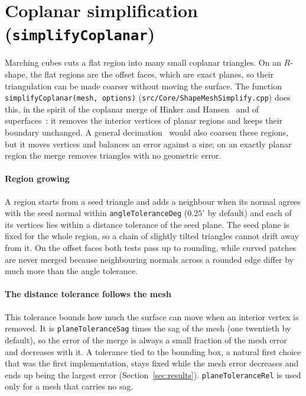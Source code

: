 \documentclass[11pt,a4paper]{article}
\newcommand{\code}[1]{\texttt{#1}}
\begin{document}
\section{Coplanar simplification (\texttt{simplifyCoplanar})}
\label{sec:simplify}

Marching cubes cuts a flat region into many small coplanar triangles. On an
$R$-shape, the flat regions are the offset faces, which are exact planes, so their
triangulation can be made coarser without moving the surface. The function
\code{simplifyCoplanar(mesh, options)} (\code{src/Core/ShapeMeshSimplify.cpp})
does this, in the spirit of the coplanar merge of Hinker and
Hansen~\cite{hinker1993} and of superfaces~\cite{kalvin1996}: it removes the
interior vertices of planar regions and keeps their boundary unchanged. A general
decimation~\cite{schroeder1992,garland1997} would also coarsen these regions, but it
moves vertices and balances an error against a size; on an exactly planar region
the merge removes triangles with no geometric error.

\paragraph{Region growing} A region starts from a seed triangle and adds a
neighbour when its normal agrees with the seed normal within
\code{angleToleranceDeg} ($0.25^\circ$ by default) and each of its vertices lies
within a distance tolerance of the seed plane. The seed plane is fixed for the
whole region, so a chain of slightly tilted triangles cannot drift away from it.
On the offset faces both tests pass up to rounding, while curved patches are never
merged because neighbouring normals across a rounded edge differ by much more than
the angle tolerance.

\paragraph{The distance tolerance follows the mesh} This tolerance bounds how much
the surface can move when an interior vertex is removed. It is
\code{planeToleranceSag} times the sag of the mesh (one twentieth by default), so
the error of the merge is always a small fraction of the mesh error and decreases
with it. A tolerance tied to the bounding box, a natural first choice that was the
first implementation, stays fixed while the mesh error decreases and ends up being
the largest error (Section~\ref{sec:results}). \code{planeToleranceRel} is used only
for a mesh that carries no sag.
\end{document}
